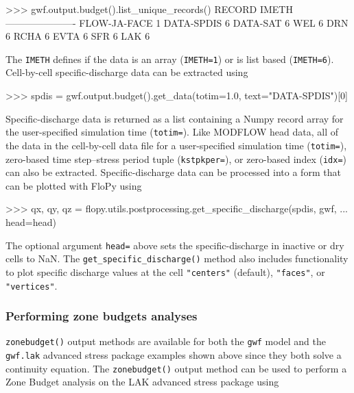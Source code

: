 \documentclass[11pt, oneside]{article}  	%
\begin{document}
\begin{python}
>>> gwf.output.budget().list_unique_records()
RECORD           IMETH
----------------------
FLOW-JA-FACE         1
DATA-SPDIS           6
DATA-SAT             6
WEL                  6
DRN                  6
RCHA                 6
EVTA                 6
SFR                  6
LAK                  6
\end{python}

\noindent The \texttt{IMETH} defines if the data is an array (\texttt{IMETH=1}) or is list based (\texttt{IMETH=6}). Cell-by-cell specific-discharge data can be extracted using

\begin{python}
>>> spdis = gwf.output.budget().get_data(totim=1.0, text="DATA-SPDIS")[0]
\end{python}

\noindent Specific-discharge data is returned as a list containing a Numpy record array for the user-specified simulation time (\texttt{totim=}). Like MODFLOW head data, all of the data in the cell-by-cell data file for a user-specified simulation time (\texttt{totim=}), zero-based time step--stress period tuple (\texttt{kstpkper=}), or zero-based index (\texttt{idx=}) can also be extracted. Specific-discharge data can be processed into a form that can be plotted with FloPy using 

\begin{python}
>>> qx, qy, qz = flopy.utils.postprocessing.get_specific_discharge(spdis, gwf, 
... head=head)
\end{python}

\noindent The optional argument \texttt{head=} above sets the specific-discharge in inactive or dry cells to NaN. The \texttt{get\_specific\_discharge()} method also includes functionality to plot specific discharge values at the cell \texttt{"centers"} (default), \texttt{"faces"}, or \texttt{"vertices"}. 

\subsubsection{Performing zone budgets analyses}

\texttt{zonebudget()} output methods are available for both the \texttt{gwf} model and the \texttt{gwf.lak} advanced stress package examples shown above since they both solve a continuity equation. The \texttt{zonebudget()} output method can be used to perform a Zone Budget analysis on the LAK advanced stress package using
\end{document}
